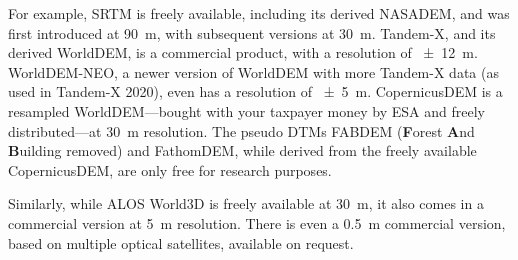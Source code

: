 %

For example, SRTM is freely available,
including its derived NASADEM, and was first introduced at \qty{90}{m}, with subsequent versions at \qty{30}{m}.
Tandem-X, and its derived WorldDEM, is a commercial product, with a resolution of \qty{\pm12}{m}.
WorldDEM-NEO, a newer version of WorldDEM with more Tandem-X data (as used in Tandem-X 2020), even has a resolution of \qty{\pm5}{m}.
CopernicusDEM is a resampled WorldDEM---bought with your taxpayer money by ESA and freely distributed---at \qty{30}{m} resolution.
The pseudo DTMs FABDEM (\textbf{F}orest \textbf{A}nd \textbf{B}uilding removed) and FathomDEM, while derived from the freely available CopernicusDEM, are only free for research purposes.

Similarly, while ALOS World3D is freely available at \qty{30}{m}, it also comes in a commercial version at \qty{5}{m} resolution.
There is even a \qty{0.5}{m} commercial version, based on multiple optical satellites, available on request.



